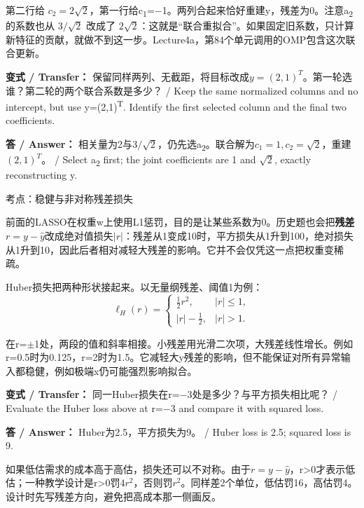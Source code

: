 第二行给 \(c_2=2\sqrt2\)，第一行给c\textsubscript{1}=\ensuremath{-}1。两列合起来恰好重建y，残差为0。注意a\textsubscript{2}的系数也从 \(3/\sqrt2\) 改成了 \(2\sqrt2\)：这就是“联合重拟合”。如果固定旧系数，只计算新特征的贡献，就做不到这一步。Lecture4a，第84个单元调用的OMP包含这次联合更新。


\textbf{变式 / Transfer：} 保留同样两列、无截距，将目标改成\(y=(2,1)^T\)。第一轮选谁？第二轮的两个联合系数是多少？ / Keep the same normalized columns and no intercept, but use y=(2,1)\textsuperscript{T}. Identify the first selected column and the final two coefficients.


\textbf{答 / Answer：} 相关量为2与\(3/\sqrt2\)，仍先选a\textsubscript{2}。联合解为\(c_1=1,c_2=\sqrt2\)，重建\((2,1)^T\)。 / Select a\textsubscript{2} first; the joint coefficients are 1 and \(\sqrt{2}\), exactly reconstructing y.








考点：稳健与非对称残差损失

前面的LASSO在权重w上使用L1惩罚，目的是让某些系数为0。历史题也会把\textbf{残差}\(r=y-\hat y\)改成绝对值损失\(|r|\)：残差从1变成10时，平方损失从1升到100，绝对损失从1升到10，因此后者相对减轻大残差的影响。它并不会仅凭这一点把权重变稀疏。


Huber损失把两种形状接起来。以无量纲残差、阈值1为例：
\[
\ell_H(r)=\begin{cases}\frac12r^2,&|r|\le1,\\|r|-\frac12,&|r|>1.\end{cases}\tag{4.15}
\]


在r=\ensuremath{\pm}1处，两段的值和斜率相接。小残差用光滑二次项，大残差线性增长。例如r=0.5时为0.125，r=2时为1.5。它减轻大y残差的影响，但不能保证对所有异常输入都稳健，例如极端x仍可能强烈影响拟合。


\textbf{变式 / Transfer：} 同一Huber损失在r=\ensuremath{-}3处是多少？与平方损失相比呢？ / Evaluate the Huber loss above at r=\ensuremath{-}3 and compare it with squared loss.


\textbf{答 / Answer：} Huber为2.5，平方损失为9。 / Huber loss is 2.5; squared loss is 9.


如果低估需求的成本高于高估，损失还可以不对称。由于\(r=y-\hat y\)，r>0才表示低估；一种教学设计是r>0罚\(4r^2\)，否则罚\(r^2\)。同样差2个单位，低估罚16，高估罚4。设计时先写残差方向，避免把高成本那一侧画反。


